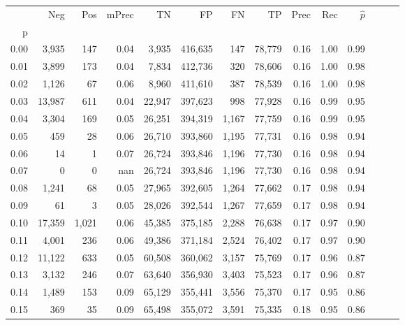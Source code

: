 \begin{tabular}{rrrrrrrrrrrrrr}
\toprule
{} &     Neg &    Pos & mPrec &       TN &       FP &      FN &      TP &  Prec &   Rec & $\hat{p}$ \\
p    &         &        &       &          &          &         &         &       &       &           \\
\midrule
0.00 &   3,935 &    147 &  0.04 &    3,935 &  416,635 &     147 &  78,779 &  0.16 &  1.00 &      0.99 \\
0.01 &   3,899 &    173 &  0.04 &    7,834 &  412,736 &     320 &  78,606 &  0.16 &  1.00 &      0.98 \\
0.02 &   1,126 &     67 &  0.06 &    8,960 &  411,610 &     387 &  78,539 &  0.16 &  1.00 &      0.98 \\
0.03 &  13,987 &    611 &  0.04 &   22,947 &  397,623 &     998 &  77,928 &  0.16 &  0.99 &      0.95 \\
0.04 &   3,304 &    169 &  0.05 &   26,251 &  394,319 &   1,167 &  77,759 &  0.16 &  0.99 &      0.95 \\
0.05 &     459 &     28 &  0.06 &   26,710 &  393,860 &   1,195 &  77,731 &  0.16 &  0.98 &      0.94 \\
0.06 &      14 &      1 &  0.07 &   26,724 &  393,846 &   1,196 &  77,730 &  0.16 &  0.98 &      0.94 \\
0.07 &       0 &      0 &   nan &   26,724 &  393,846 &   1,196 &  77,730 &  0.16 &  0.98 &      0.94 \\
0.08 &   1,241 &     68 &  0.05 &   27,965 &  392,605 &   1,264 &  77,662 &  0.17 &  0.98 &      0.94 \\
0.09 &      61 &      3 &  0.05 &   28,026 &  392,544 &   1,267 &  77,659 &  0.17 &  0.98 &      0.94 \\
0.10 &  17,359 &  1,021 &  0.06 &   45,385 &  375,185 &   2,288 &  76,638 &  0.17 &  0.97 &      0.90 \\
0.11 &   4,001 &    236 &  0.06 &   49,386 &  371,184 &   2,524 &  76,402 &  0.17 &  0.97 &      0.90 \\
0.12 &  11,122 &    633 &  0.05 &   60,508 &  360,062 &   3,157 &  75,769 &  0.17 &  0.96 &      0.87 \\
0.13 &   3,132 &    246 &  0.07 &   63,640 &  356,930 &   3,403 &  75,523 &  0.17 &  0.96 &      0.87 \\
0.14 &   1,489 &    153 &  0.09 &   65,129 &  355,441 &   3,556 &  75,370 &  0.17 &  0.95 &      0.86 \\
0.15 &     369 &     35 &  0.09 &   65,498 &  355,072 &   3,591 &  75,335 &  0.18 &  0.95 &      0.86 \\

\end{tabular}
